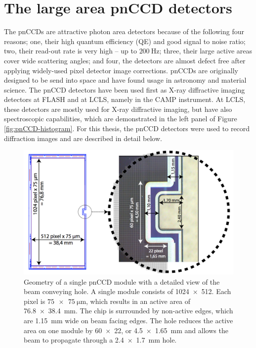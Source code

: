 \section{The large area pnCCD detectors}\label{sec:pnCCD}
The pnCCDs are attractive photon area detectors because of the following four reasons; one, their high quantum efficiency (QE) and good signal to noise ratio; two, their read-out rate is very high -- up to $\SI{200}{\hertz}$; three, their large active areas cover wide scattering angles; and four, the detectors are almost defect free after applying widely-used pixel detector image corrections. pnCCDs are originally designed to be send into space and have found usage in astronomy and material science. The pnCCD detectors have been used first as X-ray diffractive imaging detectors at FLASH and at LCLS, namely in the CAMP instrument. At LCLS, these detectors are mostly used for X-ray diffractive imaging, but have also spectroscopic capabilities, which are demonstrated in the left panel of Figure \ref{fig:pnCCD-histogram}. For this thesis, the pnCCD detectors were used to record diffraction images and are described in detail below.\\[1\baselineskip]
%
\begin{figure}
   \includegraphics[width=0.8\linewidth]{images/pnCCD-detail.png}
    \caption[Geometry of a single pnCCD module.]{Geometry of a single pnCCD module with a detailed view of the beam conveying hole. A single module consists of \SI{1024 x 512}{\pixels}. Each pixel is $\SI{75 x 75}{\micro\meter}$, which results in an active area of \SI{76.8 x 38.4}{\milli\meter}. The chip is surrounded by non-active edges, which are \SI{1.15}{\milli\meter} wide on beam facing edges. The hole reduces the active area on one module by \SI{60 x 22}{\pixels}, or \SI{4.5 x 1.65}{\milli\meter} and allows the beam to propagate through a \SI{2.4 x 1.7}{\milli\meter} hole.}
\label{fig:ccd-detail}
\end{figure}
